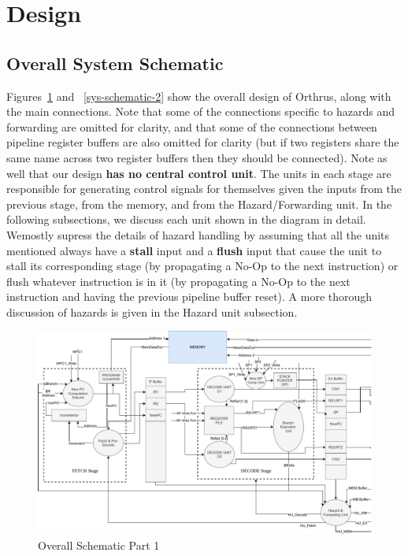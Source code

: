 \documentclass[12pt]{article}
\theoremstyle{plain}
\theoremstyle{definition}
\begin{document}
\section{Design}
\subsection{Overall System Schematic}
Figures~\ref{sys-schematic-1} and ~\ref{sys-schematic-2} show the overall design of Orthrus, along with the main connections. Note that some of the connections specific to hazards and forwarding are omitted for clarity, and that some of the connections between pipeline register buffers are also omitted for clarity (but if two registers share the same name across two register buffers then they should be connected). Note as well that our design \textbf{has no central control unit}. The units in each stage are responsible for generating control signals for themselves given the inputs from the previous stage, from the memory, and from the Hazard/Forwarding unit. In the following subsections, we discuss each unit shown in the diagram in detail. Wemostly supress the details of hazard handling by assuming that all the units mentioned always have a \textbf{stall} input and a \textbf{flush} input that cause the unit to stall its corresponding stage (by propagating a No-Op to the next instruction) or flush whatever instruction is in it (by propagating a No-Op to the next instruction and having the previous pipeline buffer reset). A more thorough discussion of hazards is given in the Hazard unit subsection.
    \begin{figure}
        \centering
        \includegraphics[page=1]{Diagrams/SystemOverviewSplit}
        \caption{Overall Schematic Part 1}
        \label{sys-schematic-1}
    \end{figure}
\end{document}
